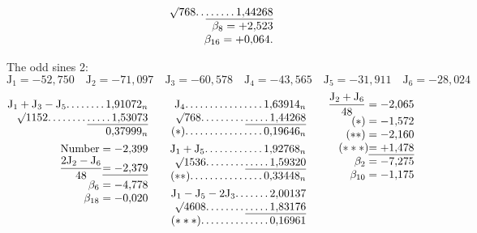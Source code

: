 \begin{landscape}
\[\begin{array}{@{}r@{\qquad}r@{}}
&\BareRoot{768}\VfourDots{1}\underline{\VfourDots{5}1{,}44268}\\
&\beta_8=+2{,}523\\
&\beta_{16}=+0{,}064.
\end{array}
\]
\par\noindent\hspace*{\parindent}The odd sines 2:
\[\mathrm{J}_1=-52{,}750\quad\mathrm{J}_2=-71{,}097\quad\mathrm{J}_3=-60{,}578\quad\mathrm{J}_4=-43{,}565\quad\mathrm{J}_5=-31{,}911\quad\mathrm{J}_6=-28{,}024\]
\[
\begin{array}{@{}r@{\qquad}r@{\qquad}r@{}}
\begin{array}[t]{@{}r@{}}
\mathrm{J}_1+\mathrm{J}_3-\mathrm{J}_5\VfourDots{7}1{,}91072_n\\
\BareRoot{1152}\VfourDots{7}\underline{\VfourDots{4}1{,}53073}\\
0{,}37999_n\\[4pt]
\text{Number}=-2{,}399\\
\dfrac{2\mathrm{J}_2-\mathrm{J}_6}{48}\underline{=-2{,}379}\\
\beta_6=-4{,}778\\
\beta_{18}=-0{,}020
\end{array}
&\begin{array}[t]{@{}r@{}}
\mathrm{J}_4\VfourDots{15}1{,}63914_n\\
\BareRoot{768}\VfourDots{8}\underline{\VfourDots{4}1{,}44268}\\
(*)\VfourDots{15}0{,}19646_n\\[4pt]
\mathrm{J}_1+\mathrm{J}_5\VfourDots{11}1{,}92768_n\\
\BareRoot{1536}\VfourDots{7}\underline{\VfourDots{4}1{,}59320}\\
(**)\VfourDots{14}0{,}33448_n\\[4pt]
\mathrm{J}_1-\mathrm{J}_5-2\mathrm{J}_3\VfourDots{6}2{,}00137\\
\BareRoot{4608}\VfourDots{7}\underline{\VfourDots{4}1{,}83176}\\
(***)\VfourDots{13}0{,}16961
\end{array}
&\begin{array}[t]{@{}r@{}}
\dfrac{\mathrm{J}_2+\mathrm{J}_6}{48}=-2{,}065\\
(*)=-1{,}572\\
(**)=-2{,}160\\
(***)\underline{=+1{,}478}\\
\beta_2=-7{,}275\\
\beta_{10}=-1{,}175\\

\end{array}
\end{array}\]
\end{landscape}
